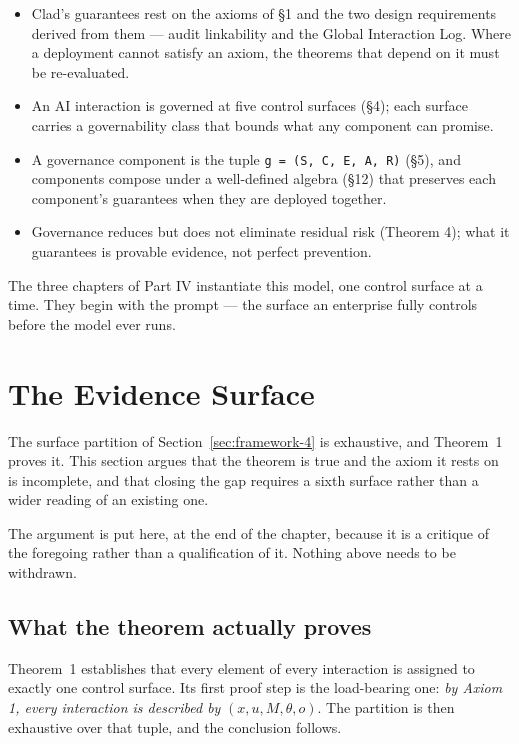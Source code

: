 \begin{itemize}
  \item Clad's guarantees rest on the axioms of \S{}1 and the two design requirements derived from them --- audit linkability and the Global Interaction Log. Where a deployment cannot satisfy an axiom, the theorems that depend on it must be re-evaluated.
  \item An AI interaction is governed at five control surfaces (\S{}4); each surface carries a governability class that bounds what any component can promise.
  \item A governance component is the tuple \texttt{g = (S, C, E, A, R)} (\S{}5), and components compose under a well-defined algebra (\S{}12) that preserves each component's guarantees when they are deployed together.
  \item Governance reduces but does not eliminate residual risk (Theorem 4); what it guarantees is provable evidence, not perfect prevention.
\end{itemize}


The three chapters of Part IV instantiate this model, one control surface at a time. They begin with the prompt --- the surface an enterprise fully controls before the model ever runs.

\section{The Evidence Surface}
\label{sec:framework-15}

The surface partition of Section~\ref{sec:framework-4} is exhaustive, and
Theorem~1 proves it. This section argues that the theorem is true and the axiom it
rests on is incomplete, and that closing the gap requires a sixth surface rather than
a wider reading of an existing one.

The argument is put here, at the end of the chapter, because it is a critique of the
foregoing rather than a qualification of it. Nothing above needs to be withdrawn.

\subsection{What the theorem actually proves}

Theorem~1 establishes that every element of every interaction is assigned to exactly
one control surface. Its first proof step is the load-bearing one: \emph{by Axiom 1,
every interaction is described by} $(x, u, M, \theta, o)$. The partition is then
exhaustive over that tuple, and the conclusion follows.


